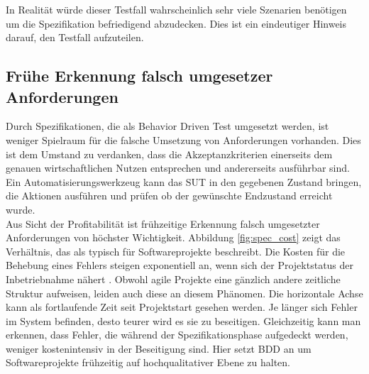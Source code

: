 In Realität würde dieser Testfall wahrscheinlich sehr viele Szenarien benötigen um die Spezifikation befriedigend abzudecken. Dies ist ein eindeutiger Hinweis darauf, den Testfall aufzuteilen.

\subsection{Frühe Erkennung falsch umgesetzer Anforderungen}
Durch Spezifikationen, die als Behavior Driven Test umgesetzt werden, ist weniger Spielraum für die falsche Umsetzung von Anforderungen vorhanden. Dies ist dem Umstand zu verdanken, dass die Akzeptanzkriterien einerseits dem genauen wirtschaftlichen Nutzen entsprechen und andererseits ausführbar sind. Ein Automatisierungswerkzeug kann das \Gls{SUT} in den gegebenen Zustand bringen, die Aktionen ausführen und prüfen ob der gewünschte Endzustand erreicht wurde.\\
Aus Sicht der Profitabilität ist frühzeitige Erkennung falsch umgesetzter Anforderungen von höchster Wichtigkeit. Abbildung \ref{fig:spec_cost} zeigt das Verhältnis, das \citeauthor{boehm_software_1981} als typisch für Softwareprojekte beschreibt. Die Kosten für die Behebung eines Fehlers steigen exponentiell an, wenn sich der Projektstatus der Inbetriebnahme nähert \cite{boehm_software_1981}. Obwohl agile Projekte eine gänzlich andere zeitliche Struktur aufweisen, leiden auch diese an diesem Phänomen. Die horizontale Achse kann als fortlaufende Zeit seit Projektstart gesehen werden. Je länger sich Fehler im System befinden, desto teurer wird es sie zu beseitigen. Gleichzeitig kann man erkennen, dass Fehler, die während der Spezifikationsphase aufgedeckt werden, weniger kostenintensiv in der Beseitigung sind. Hier setzt \Gls{BDD} an um Softwareprojekte frühzeitig auf hochqualitativer Ebene zu halten.

